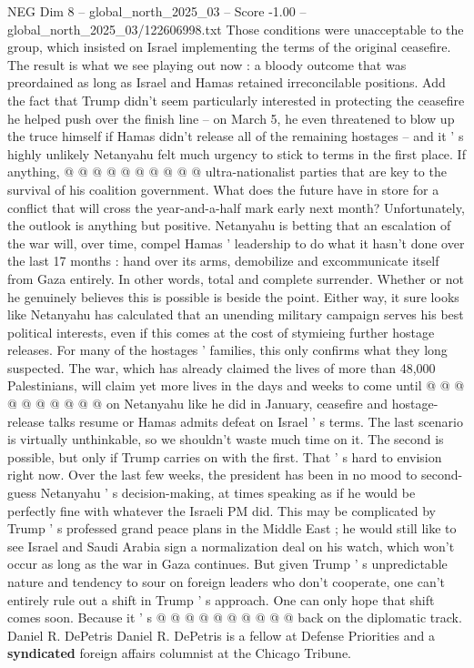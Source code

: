 \begin{textsample}{NEG Dim 8 – global\_north\_2025\_03 – Score -1.00 – global\_north\_2025\_03/122606998.txt}
Those conditions were unacceptable to the group, which insisted on Israel implementing the terms of the original ceasefire.
The result is what we see playing out now : a bloody outcome that was preordained as long as Israel and Hamas retained irreconcilable positions.
Add the fact that Trump didn't seem particularly interested in protecting the ceasefire he helped push over the finish line -- on March 5, he even threatened to blow up the truce himself if Hamas didn't release all of the remaining hostages -- and it ' s highly unlikely Netanyahu felt much urgency to stick to terms in the first place.
If anything, @ @ @ @ @ @ @ @ @ @ ultra-nationalist parties that are key to the survival of his coalition government.
What does the future have in store for a conflict that will cross the year-and-a-half mark early next month?
Unfortunately, the outlook is anything but positive.
Netanyahu is betting that an escalation of the war will, over time, compel Hamas ' leadership to do what it hasn't done over the last 17 months : hand over its arms, demobilize and excommunicate itself from Gaza entirely.
In other words, total and complete surrender.
Whether or not he genuinely believes this is possible is beside the point.
Either way, it sure looks like Netanyahu has calculated that an unending military campaign serves his best political interests, even if this comes at the cost of stymieing further hostage releases.
For many of the hostages ' families, this only confirms what they long suspected.
The war, which has already claimed the lives of more than 48,000 Palestinians, will claim yet more lives in the days and weeks to come until @ @ @ @ @ @ @ @ @ @ on Netanyahu like he did in January, ceasefire and hostage-release talks resume or Hamas admits defeat on Israel ' s terms.
The last scenario is virtually unthinkable, so we shouldn't waste much time on it.
The second is possible, but only if Trump carries on with the first.
That ' s hard to envision right now.
Over the last few weeks, the president has been in no mood to second-guess Netanyahu ' s decision-making, at times speaking as if he would be perfectly fine with whatever the Israeli PM did.
This may be complicated by Trump ' s professed grand peace plans in the Middle East ; he would still like to see Israel and Saudi Arabia sign a normalization deal on his watch, which won't occur as long as the war in Gaza continues.
But given Trump ' s unpredictable nature and tendency to sour on foreign leaders who don't cooperate, one can't entirely rule out a shift in Trump ' s approach.
One can only hope that shift comes soon.
Because it ' s @ @ @ @ @ @ @ @ @ @ back on the diplomatic track.
Daniel R.
DePetris Daniel R.
DePetris is a fellow at Defense Priorities and a \textbf{syndicated} foreign affairs columnist at the Chicago Tribune.

\end{textsample}
